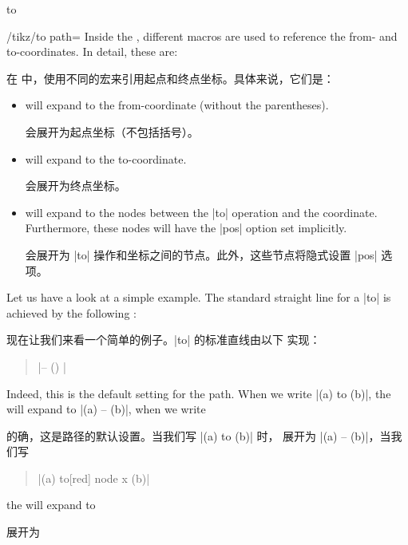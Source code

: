 \begin{pathoperation}{to}{
         }
\begin{key}{/tikz/to path=}
        Inside the , different macros are used to reference the
        from- and to-coordinates. In detail, these are:

        在  中，使用不同的宏来引用起点和终点坐标。具体来说，它们是：

        \begin{itemize}
            \item \declareandlabel{\tikztostart} will expand to the
                from-coordinate (without the parentheses).

                \declareandlabel{\tikztostart} 会展开为起点坐标（不包括括号）。
            \item \declareandlabel{\tikztotarget} will expand to the
                to-coordinate.

                \declareandlabel{\tikztotarget} 会展开为终点坐标。
            \item \declareandlabel{\tikztonodes} will expand to the nodes
                between the |to| operation and the coordinate. Furthermore,
                these nodes will have the |pos| option set implicitly.

                \declareandlabel{\tikztonodes} 会展开为 |to| 操作和坐标之间的节点。此外，这些节点将隐式设置 |pos| 选项。
        \end{itemize}

        Let us have a look at a simple example. The standard straight line for
        a |to| is achieved by the following :

        现在让我们来看一个简单的例子。|to| 的标准直线由以下  实现：

        \begin{quote}
            |-- (\tikztotarget) \tikztonodes|
        \end{quote}

        Indeed, this is the default setting for the path. When we write
        |(a) to (b)|, the  will expand to |(a) -- (b)|, when we
        write

        的确，这是路径的默认设置。当我们写
        |(a) to (b)| 时， 展开为 |(a) -- (b)|，当我们写
    
        \begin{quote}
            |(a) to[red] node {x} (b)|
        \end{quote}
        the  will expand to

         展开为


\end{key}
\end{pathoperation}
